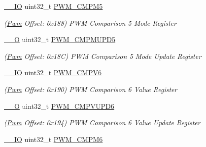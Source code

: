 \begin{DoxyCompactItemize}
\mbox{\hyperlink{core__cm7_8h_aec43007d9998a0a0e01faede4133d6be}{\+\_\+\+\_\+\+IO}} uint32\+\_\+t \mbox{\hyperlink{structPwm_abf5833cc7229cd2b49a9cd344f94cb20}{P\+W\+M\+\_\+\+C\+M\+P\+M5}}
\begin{DoxyCompactList}\small\item\em (\mbox{\hyperlink{structPwm}{Pwm}} Offset\+: 0x188) P\+WM Comparison 5 Mode Register \end{DoxyCompactList}\item 
\mbox{\label{structPwm_af8d1005700908f5e8e9bbb5eba95e984}} 
\mbox{\hyperlink{core__cm7_8h_a7e25d9380f9ef903923964322e71f2f6}{\+\_\+\+\_\+O}} uint32\+\_\+t \mbox{\hyperlink{structPwm_af8d1005700908f5e8e9bbb5eba95e984}{P\+W\+M\+\_\+\+C\+M\+P\+M\+U\+P\+D5}}
\begin{DoxyCompactList}\small\item\em (\mbox{\hyperlink{structPwm}{Pwm}} Offset\+: 0x18C) P\+WM Comparison 5 Mode Update Register \end{DoxyCompactList}\item 
\mbox{\label{structPwm_ad234b6219682f64d35ed36911637b685}} 
\mbox{\hyperlink{core__cm7_8h_aec43007d9998a0a0e01faede4133d6be}{\+\_\+\+\_\+\+IO}} uint32\+\_\+t \mbox{\hyperlink{structPwm_ad234b6219682f64d35ed36911637b685}{P\+W\+M\+\_\+\+C\+M\+P\+V6}}
\begin{DoxyCompactList}\small\item\em (\mbox{\hyperlink{structPwm}{Pwm}} Offset\+: 0x190) P\+WM Comparison 6 Value Register \end{DoxyCompactList}\item 
\mbox{\label{structPwm_a653ef86e17380a11d23c3882d86ee5e3}} 
\mbox{\hyperlink{core__cm7_8h_a7e25d9380f9ef903923964322e71f2f6}{\+\_\+\+\_\+O}} uint32\+\_\+t \mbox{\hyperlink{structPwm_a653ef86e17380a11d23c3882d86ee5e3}{P\+W\+M\+\_\+\+C\+M\+P\+V\+U\+P\+D6}}
\begin{DoxyCompactList}\small\item\em (\mbox{\hyperlink{structPwm}{Pwm}} Offset\+: 0x194) P\+WM Comparison 6 Value Update Register \end{DoxyCompactList}\item 
\mbox{\label{structPwm_a0020604e8251cb59140ad101b0cc12cd}} 
\mbox{\hyperlink{core__cm7_8h_aec43007d9998a0a0e01faede4133d6be}{\+\_\+\+\_\+\+IO}} uint32\+\_\+t \mbox{\hyperlink{structPwm_a0020604e8251cb59140ad101b0cc12cd}{P\+W\+M\+\_\+\+C\+M\+P\+M6}}

\end{DoxyCompactItemize}
